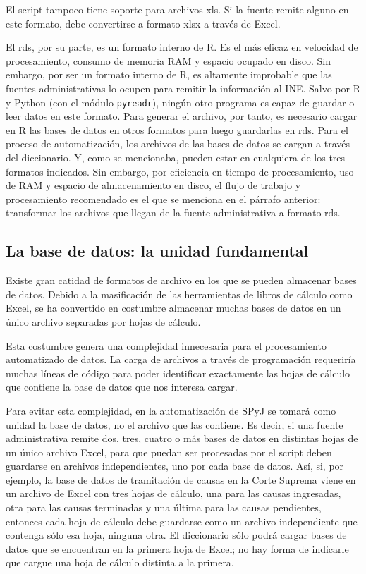 \documentclass[
  spanish,
]{book}
\begin{document}
El script tampoco tiene soporte para archivos xls. Si la fuente remite alguno en este formato, debe convertirse a formato xlsx a través de Excel.

El rds, por su parte, es un formato interno de R. Es el más eficaz en velocidad de procesamiento, consumo de memoria RAM y espacio ocupado en disco. Sin embargo, por ser un formato interno de R, es altamente improbable que las fuentes administrativas lo ocupen para remitir la información al INE. Salvo por R y Python (con el módulo \texttt{pyreadr}), ningún otro programa es capaz de guardar o leer datos en este formato. Para generar el archivo, por tanto, es necesario cargar en R las bases de datos en otros formatos para luego guardarlas en rds.
Para el proceso de automatización, los archivos de las bases de datos se cargan a través del diccionario. Y, como se mencionaba, pueden estar en cualquiera de los tres formatos indicados. Sin embargo, por eficiencia en tiempo de procesamiento, uso de RAM y espacio de almacenamiento en disco, el flujo de trabajo y procesamiento recomendado es el que se menciona en el párrafo anterior: transformar los archivos que llegan de la fuente administrativa a formato rds.

\hypertarget{la-base-de-datos-la-unidad-fundamental}{%
\subsection{La base de datos: la unidad fundamental}\label{la-base-de-datos-la-unidad-fundamental}}

Existe gran catidad de formatos de archivo en los que se pueden almacenar bases de datos. Debido a la masificación de las herramientas de libros de cálculo como Excel, se ha convertido en costumbre almacenar muchas bases de datos en un único archivo separadas por hojas de cálculo.

Esta costumbre genera una complejidad innecesaria para el procesamiento automatizado de datos. La carga de archivos a través de programación requeriría muchas líneas de código para poder identificar exactamente las hojas de cálculo que contiene la base de datos que nos interesa cargar.

Para evitar esta complejidad, en la automatización de SPyJ se tomará como unidad la base de datos, no el archivo que las contiene. Es decir, si una fuente administrativa remite dos, tres, cuatro o más bases de datos en distintas hojas de un único archivo Excel, para que puedan ser procesadas por el script deben guardarse en archivos independientes, uno por cada base de datos. Así, si, por ejemplo, la base de datos de tramitación de causas en la Corte Suprema viene en un archivo de Excel con tres hojas de cálculo, una para las causas ingresadas, otra para las causas terminadas y una última para las causas pendientes, entonces cada hoja de cálculo debe guardarse como un archivo independiente que contenga sólo esa hoja, ninguna otra. El diccionario sólo podrá cargar bases de datos que se encuentran en la primera hoja de Excel; no hay forma de indicarle que cargue una hoja de cálculo distinta a la primera.
\end{document}
